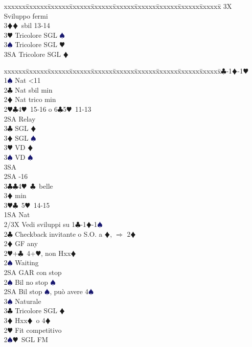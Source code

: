 \documentclass[a4paper,italian]{article}
\newcommand{\BC}{\textcolor{OliveGreen}{$\clubsuit$}}
\newcommand{\BD}{\textcolor{RedOrange}{$\vardiamondsuit$}}
\newcommand{\BH}{\textcolor{Red2}{$\varheartsuit${}}}
\newcommand{\BS}{\textcolor{MidnightBlue}{$\spadesuit${}}}
\newenvironment{bidtable}
{\begin{tabbing}

    xxxxxx\=xxxxxx\=xxxxxx\=xxxxxx\=xxxxxx\=xxxxxx\=xxxxxx\=xxxxxx\=xxxxxx\=xxxxxx\=\kill}
{\end{tabbing} }%
\begin{document}
\begin{multicols}{2}
\begin{bidtable}
        3X \> Sviluppo fermi\-\\
        3\BD {}\BD\ sbil 13-14\\
        3\BH \> Tricolore SGL \BS \\
        3\BS \> Tricolore SGL \BH \\
        3SA \> Tricolore SGL \BD \-
    \end{bidtable}
    \begin{bidtable}
        1\BC-1\BD-1\BH\+\\
        1\BS \> Nat <11\+\\
        2\BC \> Nat sbil min\\
        2\BD \> Nat trico min\\
        2\BH {}\BC 4\BH\ 15-16 o 6\BC 5\BH\ 11-13\+\\
        2SA \> Relay\+\\
        3\BC {} SGL \BD\\
        3\BD {} SGL \BS\\
        3\BH {} VD \BD\\
        3\BS {} VD \BS\\
        3SA \-\-\\
        2SA -16\\
        3\BC {}\BC 4\BH\ \BC\ belle\\
        3\BD {} min\\
        3\BH {}\BC\ 5\BH\ 14-15\-\\
        1SA \> Nat\+\\
        2/3X \> Vedi sviluppi su 1\BC -1\BD -1\BS \-\\
        2\BC \> Checkback invitante o S.O. a \BD , $\Rightarrow$ 2\BD \\
        2\BD \> GF any\+\\
        2\BH {}+\BC\ 4+\BH, non Hxx\BD\+\\
        2\BS\> Waiting\\
        2SA \> GAR con stop\-\\
        2\BS \> Bil no stop \BS \\
        2SA \> Bil stop \BS , può avere 4\BS \+\\
        3\BS \> Naturale\-\\
        3\BC \> Tricolore SGL \BD \\
        3\BD \> Hxx\BD\ o 4\BD\-\\
        [2pt]2\BH \> Fit competitivo\\
        2\BS {}\BH\ SGL FM\+\\

\end{bidtable}
\end{multicols}
\end{document}
